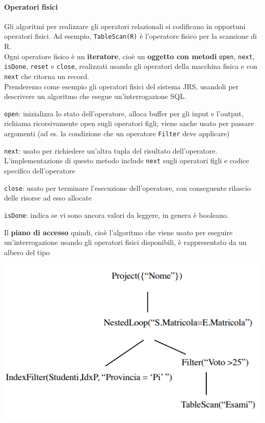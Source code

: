 \documentclass[10pt]{book}
\begin{document}
\paragraph{Operatori fisici} Gli algoritmi per realizzare gli operatori relazionali si codificano in opportuni operatori fisici. Ad esempio, \texttt{TableScan(R)} è l'operatore fisico per la scansione di R.\\
Ogni operatore fisico è un \textbf{iteratore}, cioè un \textbf{oggetto con metodi} \texttt{open}, \texttt{next}, \texttt{isDone}, \texttt{reset} e \texttt{close}, realizzati usando gli operatori della macchina fisica e con \texttt{next} che ritorna un record.\\
Prenderemo come esempio gli operatori fisici del sistema JRS, usandoli per descrivere un algoritmo che esegue un'interrogazione SQL.
\begin{list}{}{}
	\item \texttt{open}: inizializza lo stato dell'operatore,  alloca buffer per gli input e l’output, richiama ricorsivamente open sugli operatori figli; viene anche usato per passare argomenti (ad es. la condizione che un operatore \texttt{Filter} deve applicare)
	\item \texttt{next}: usato per richiedere un’altra tupla del risultato dell’operatore. L’implementazione di questo metodo include \texttt{next} sugli operatori figli e codice specifico dell’operatore
	\item \texttt{close}: usato per terminare l’esecuzione dell’operatore, con conseguente rilascio delle risorse ad esso allocate
	\item \texttt{isDone}: indica se vi sono ancora valori da leggere, in genera è booleano.
\end{list}
Il \textbf{piano di accesso} quindi, cioè l'algoritmo che viene usato per eseguire un'interrogazione usando gli operatori fisici disponibili, è rappresentato da un albero del tipo
\begin{center}
	\includegraphics[scale=0.75]{ottimizzazese2.png}
\end{center}
\end{document}
